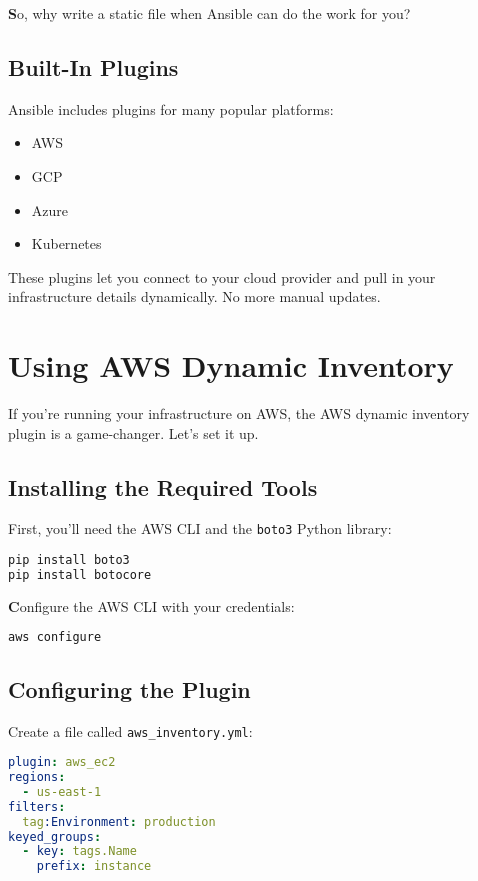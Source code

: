 \textbf{S}o, why write a static file when Ansible can do the work for you?

\subsection{Built-In Plugins}

Ansible includes plugins for many popular platforms:
\begin{itemize}
    \item AWS
    \item GCP
    \item Azure
    \item Kubernetes
\end{itemize}

These plugins let you connect to your cloud provider and pull in your infrastructure details dynamically. No more manual updates.


\section{Using AWS Dynamic Inventory}

If you're running your infrastructure on AWS, the AWS dynamic inventory plugin is a game-changer. Let's set it up.

\subsection{Installing the Required Tools}

First, you'll need the AWS CLI and the \texttt{boto3} Python library:
\begin{lstlisting}[language=bash, caption=Installing AWS Tools]
pip install boto3
pip install botocore
\end{lstlisting}

\textbf{C}onfigure the AWS CLI with your credentials:
\begin{lstlisting}[language=bash, caption=Configuring AWS CLI]
aws configure
\end{lstlisting}

\subsection{Configuring the Plugin}

Create a file called \texttt{aws\_inventory.yml}:
\begin{lstlisting}[language=yaml, caption=AWS Inventory Plugin Configuration]
plugin: aws_ec2
regions:
  - us-east-1
filters:
  tag:Environment: production
keyed_groups:
  - key: tags.Name
    prefix: instance
\end{lstlisting}

